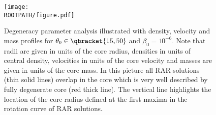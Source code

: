 \begin{figure}%
	\centering%
	\texttt{[image: \\ROOTPATH/figure.pdf]}
	\caption{Degeneracy parameter analysis illustrated with density, velocity and mass profiles for $\theta_0\in\qbracket{15,50}$ and $\beta_0 = 10^{-6}$. Note that radii are given in units of the core radius, densities in units of central density, velocities in units of the core velocity and masses are given in units of the core mass. In this picture all RAR solutions (thin solid lines) overlap in the core which is very well described by fully degenerate core (red thick line). The vertical line highlights the location of the core radius defined at the first maxima in the rotation curve of RAR solutions.}%
	\label{fig:profiles:without-cutoff:central-degeneracy:core}%
\end{figure}
